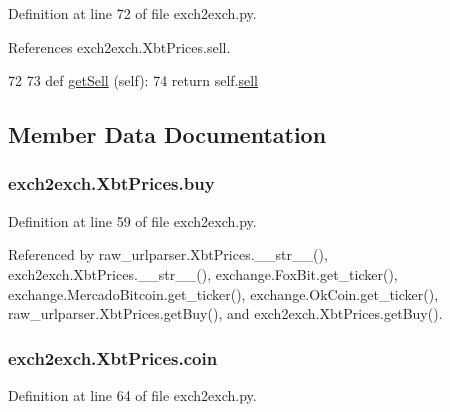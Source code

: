 Definition at line 72 of file exch2exch.\-py.



References exch2exch.\-Xbt\-Prices.\-sell.


\begin{DoxyCode}
72 
73     \textcolor{keyword}{def }\hyperlink{classexch2exch_1_1_xbt_prices_abcd54a52079952f45b5f29f3ffcd83b5}{getSell} (self):
74         \textcolor{keywordflow}{return} self.\hyperlink{classexch2exch_1_1_xbt_prices_a06fd0cfb03d485af3364a0d86fbe5385}{sell}
        
\end{DoxyCode}


\subsection{Member Data Documentation}
\hypertarget{classexch2exch_1_1_xbt_prices_a8f1d8ac0ef114ea3645314578697b7ac}{
\subsubsection[{buy}]{\setlength{\rightskip}{0pt plus 5cm}exch2exch.\-Xbt\-Prices.\-buy}}\label{classexch2exch_1_1_xbt_prices_a8f1d8ac0ef114ea3645314578697b7ac}


Definition at line 59 of file exch2exch.\-py.



Referenced by raw\-\_\-urlparser.\-Xbt\-Prices.\-\_\-\-\_\-str\-\_\-\-\_\-(), exch2exch.\-Xbt\-Prices.\-\_\-\-\_\-str\-\_\-\-\_\-(), exchange.\-Fox\-Bit.\-get\-\_\-ticker(), exchange.\-Mercado\-Bitcoin.\-get\-\_\-ticker(), exchange.\-Ok\-Coin.\-get\-\_\-ticker(), raw\-\_\-urlparser.\-Xbt\-Prices.\-get\-Buy(), and exch2exch.\-Xbt\-Prices.\-get\-Buy().

\hypertarget{classexch2exch_1_1_xbt_prices_a1191c8825e8f1333b4100b89fa2be053}{
\subsubsection[{coin}]{\setlength{\rightskip}{0pt plus 5cm}exch2exch.\-Xbt\-Prices.\-coin}}\label{classexch2exch_1_1_xbt_prices_a1191c8825e8f1333b4100b89fa2be053}


Definition at line 64 of file exch2exch.\-py.



